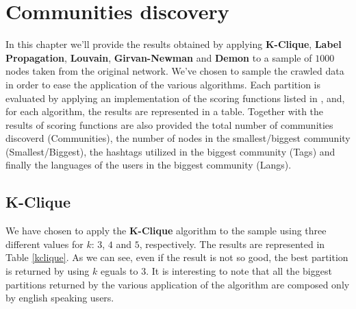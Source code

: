 \chapter{Communities discovery} %
\label{cha:communities_discovery}

In this chapter we'll provide the results obtained by applying \textbf{K-Clique}, \textbf{Label Propagation},
\textbf{Louvain}, \textbf{Girvan-Newman} and \textbf{Demon} to a sample of $1000$ nodes taken from the original
network. We've chosen to sample the crawled data in order to ease the application of the various algorithms.
Each partition is evaluated by applying an implementation of the scoring functions listed in
\cite{comm_ground_truth}, and, for each algorithm, the results are represented in a table. Together with the
results of scoring functions are also provided the total number of communities discoverd (Communities), the
number of nodes in the smallest/biggest community (Smallest/Biggest), the hashtags utilized in the biggest
community (Tags) and finally the languages of the users in the biggest community (Langs).

\section{K-Clique} %
\label{sec:k_clique}
    We have chosen to apply the \textbf{K-Clique} algorithm to the sample using three different values for
    $k$: $3$, $4$ and $5$, respectively. The results are represented in Table \ref{kclique}. As we can see, even
    if the result is not so good, the best partition is returned by using $k$ eguals to $3$. It is interesting to
    note that all the biggest partitions returned by the various application of the algorithm are composed only by
    english speaking users.

